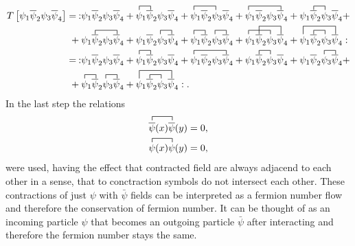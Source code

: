 \begin{align*}
		T\left[\psi_1\overline{\psi}_2\psi_3\overline{\psi}_4\right]=\:
		:&\psi_1\overline{\psi}_2\psi_3\overline{\psi}_4+
		\contraction{}{\psi}{{}_1}{\psi}\psi_1\overline{\psi}_2\psi_3\overline{\psi}_4+
		\contraction{}{\psi}{\psi_2{}_3}{\psi}\psi_1\overline{\psi}_2\psi_3\overline{\psi}_4+
		\contraction{}{\psi}{\psi_2\psi_3{}_4}{\psi}\psi_1\overline{\psi}_2\psi_3\overline{\psi}_4+
		\contraction{\psi_1}{\psi}{{}_1}{\psi}\psi_1\overline{\psi}_2\psi_3\overline{\psi}_4+\\
		+\:\contraction{\psi_1}{\psi}{\psi_2{}_3}{\psi}&\psi_1\overline{\psi}_2\psi_3\overline{\psi}_4+
		\contraction{\psi_1\psi_2}{\psi}{{}_4}{\psi}\psi_1\overline{\psi}_2\psi_3\overline{\psi}_4+
		\contraction{}{\psi}{{}_1}{\bar{\psi}}\contraction{\psi_1\psi_2}{\psi}{{}_3}{\bar{\psi}}\psi_1\overline{\psi}_2\psi_3\overline{\psi}_4+
		\contraction{}{\psi}{{}_1\psi_2}{\psi}\contraction[2ex]{\psi_1}{\psi}{{}_2\psi_3}{\psi}\psi_1\overline{\psi}_2\psi_3\overline{\psi}_4+
		\contraction[2ex]{}{\psi}{{}_1\psi_2\psi_3}{\psi}\contraction{\psi_1}{\psi}{{}_2}{\psi}\psi_1\overline{\psi}_2\psi_3\overline{\psi}_4:\:\\
		=\::&\psi_1\overline{\psi}_2\psi_3\overline{\psi}_4+\contraction{}{\psi}{{}_1}{\psi}\psi_1\overline{\psi}_2\psi_3\overline{\psi}_4+\contraction{}{\psi}{\psi_2\psi_3{}_4}{\psi}\psi_1\overline{\psi}_2\psi_3\overline{\psi}_4+\contraction{\psi_1}{\psi}{{}_1}{\psi}\psi_1\overline{\psi}_2\psi_3\overline{\psi}_4+\contraction{\psi_1\psi_2}{\psi}{{}_4}{\psi}\psi_1\overline{\psi}_2\psi_3\overline{\psi}_4+\\
		+\:\contraction{}{\psi}{{}_1}{\bar{\psi}}\contraction{\psi_1\psi_2}{\psi}{{}_3}{\bar{\psi}}&\psi_1\overline{\psi}_2\psi_3\overline{\psi}_4+\contraction[2ex]{}{\psi}{{}_1\psi_2\psi_3}{\psi}\contraction{\psi_1}{\psi}{{}_2}{\psi}\psi_1\overline{\psi}_2\psi_3\overline{\psi}_4: .
\end{align*}
In the last step the relations
\begin{align}
	\contraction{}{\overline{\psi}}{(x)}{\bar{\psi}}
	\overline{{\psi}}(x)\overline{\psi}(y)=0,
	\label{eq:selfcontraction1}
	\\
	\contraction{}{\psi}{(x)}{\psi}
	\psi(x)\psi(y)=0,
	\label{eq:selfcontraction2}
\end{align}
were used, having the effect that contracted field are always adjacend to each other in a sense, that to conctraction symbols do not intersect each other. These contractions of just $\psi$ with $\bar{\psi}$ fields can be interpreted as a fermion number flow and therefore the conservation of fermion number. It can be thought of as an incoming particle $\psi$ that becomes an outgoing particle $\bar{\psi}$ after interacting and therefore the fermion number stays the same.\newline\indent
